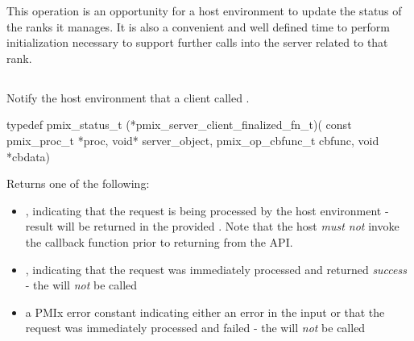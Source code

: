 \advicermstart
 This operation is an opportunity for a host environment
 to update the status of the ranks it manages.  It is also a convenient and well defined time to perform initialization necessary to
 support further calls into the server related to that rank.
 \advicermend

\subsection{}

\summary

Notify the host environment that a client called .

\format

\cspecificstart
\begin{codepar}
typedef pmix_status_t (*pmix_server_client_finalized_fn_t)(
                             const pmix_proc_t *proc,
                             void* server_object,
                             pmix_op_cbfunc_t cbfunc,
                             void *cbdata)
\end{codepar}
\cspecificend

\begin{arglist}
\end{arglist}

Returns one of the following:

\begin{itemize}
    \item {}, indicating that the request is being processed by the host environment - result will be returned in the provided . Note that the host \emph{must not} invoke the callback function prior to returning from the \ac{API}.
    \item {}, indicating that the request was immediately processed and returned \textit{success} - the  will \textit{not} be called
    \item a PMIx error constant indicating either an error in the input or that the request was immediately processed and failed - the  will \textit{not} be called
\end{itemize}

